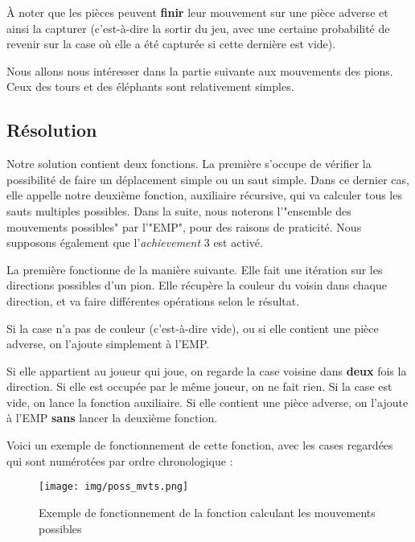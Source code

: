 \documentclass[a4paper]{article}
\begin{document}
À noter que les pièces peuvent \textbf{finir} leur mouvement sur une pièce adverse et ainsi la capturer (c'est-à-dire la sortir du jeu, avec une certaine probabilité de revenir sur la case où elle a été capturée si cette dernière est vide).

\vspace{0.5cm}

Nous allons nous intéresser dans la partie suivante aux mouvements des pions. Ceux des tours et des éléphants sont relativement simples.

\subsection{Résolution}
\label{resolv}

Notre solution contient deux fonctions. La première s'occupe de vérifier la possibilité de faire un déplacement simple ou un saut simple. Dans ce dernier cas, elle appelle notre deuxième fonction, auxiliaire récursive, qui va calculer tous les sauts multiples possibles. Dans la suite, nous noterons l'"ensemble des mouvements possibles" par l'"EMP", pour des raisons de praticité. Nous supposons également que l'\emph{achievement} 3 est activé.

\vspace{0.5cm}

La première fonctionne de la manière suivante. Elle fait une itération sur les directions possibles d'un pion. Elle récupère la couleur du voisin dans chaque direction, et va faire différentes opérations selon le résultat.

Si la case n'a pas de couleur (c'est-à-dire vide), ou si elle contient une pièce adverse, on l'ajoute simplement à l'EMP. 

Si elle appartient au joueur qui joue, on regarde la case voisine dans \textbf{deux} fois la direction. Si elle est occupée par le même joueur, on ne fait rien. Si la case est vide, on lance la fonction auxiliaire. Si elle contient une pièce adverse, on l'ajoute à l'EMP \textbf{sans} lancer la deuxième fonction.

Voici un exemple de fonctionnement de cette fonction, avec les cases regardées qui sont numérotées par ordre chronologique :

\begin{figure}[H]
  \centering
  \texttt{[image: img/poss\_mvts.png]}
  \caption{Exemple de fonctionnement de la fonction calculant les mouvements possibles}
  \label{fig:fct_mvts}
\end{figure}
\end{document}
